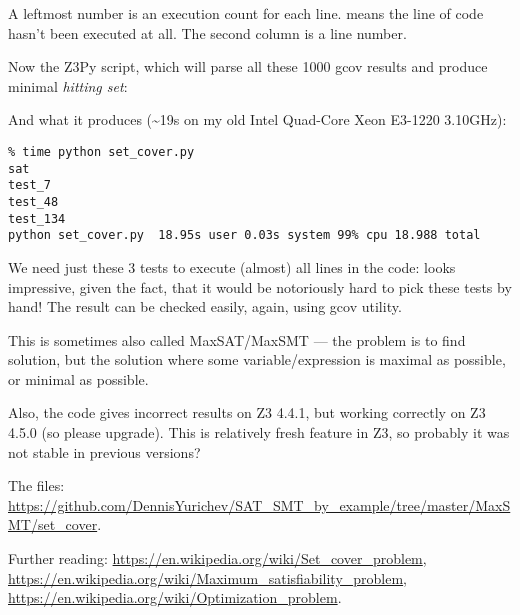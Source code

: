 A leftmost number is an execution count for each line.
\TT{\#\#\#\#\#} means the line of code hasn't been executed at all.
The second column is a line number.

Now the Z3Py script, which will parse all these 1000 gcov results and produce minimal \textit{hitting set}:



And what it produces (\textasciitilde{}19s on my old Intel Quad-Core Xeon E3-1220 3.10GHz):

\begin{lstlisting}
% time python set_cover.py
sat
test_7
test_48
test_134
python set_cover.py  18.95s user 0.03s system 99% cpu 18.988 total
\end{lstlisting}

We need just these 3 tests to execute (almost) all lines in the code:
looks impressive, given the fact, that it would be notoriously hard to pick these tests by hand!
The result can be checked easily, again, using gcov utility.

This is sometimes also called MaxSAT/MaxSMT --- the problem is to find solution,
but the solution where some variable/expression is maximal as possible, or minimal as possible.

Also, the code gives incorrect results on Z3 4.4.1, but working correctly on Z3 4.5.0 (so please upgrade).
This is relatively fresh feature in Z3, so probably it was not stable in previous versions?

The files: \url{https://github.com/DennisYurichev/SAT_SMT_by_example/tree/master/MaxSMT/set_cover}.

Further reading:
\url{https://en.wikipedia.org/wiki/Set_cover_problem},
\url{https://en.wikipedia.org/wiki/Maximum_satisfiability_problem},
\url{https://en.wikipedia.org/wiki/Optimization_problem}.

